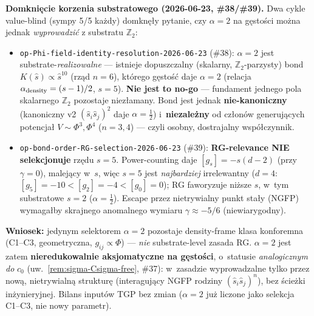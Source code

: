 \begin{remark}[Status $\alpha=2$ po~v2-pivocie --- 2026-04-25]
\medskip\noindent\textbf{Domkni\k{e}cie korzenia substratowego (2026-06-23, \#38/\#39).}
Dwa cykle value-blind (sympy 5/5 ka\.zdy) domkn\k{e}\l{}y pytanie, czy $\alpha=2$ na
g\k{e}sto\'sci mo\.zna jednak \emph{wyprowadzi\'c} z substratu $\mathbb{Z}_2$:
\begin{itemize}
  \item \texttt{op-Phi-field-identity-resolution-2026-06-23} (\#38): $\alpha=2$ jest
  substrate-\emph{realizowalne} --- istnieje dopuszczalny (skalarny, $\mathbb{Z}_2$-parzysty)
  bond $K(\hat s)\propto\hat s^{10}$ (rz\k{a}d $n=6$), kt\'orego g\k{e}sto\'s\'c daje $\alpha=2$
  (relacja $\alpha_{\rm density}=(s-1)/2$, $s=5$). \textbf{Nie jest to no-go} --- fundament
  jednego pola skalarnego $\mathbb{Z}_2$ pozostaje niez\l{}amany. Bond jest jednak
  \textbf{nie-kanoniczny} (kanoniczny v2 $(\hat s_i\hat s_j)^2$ daje $\alpha=\tfrac12$)
  i~\textbf{niezale\.zny} od cz\l{}on\'ow generuj\k{a}cych potencja\l{} $V\sim\Phi^3,\Phi^4$
  ($n=3,4$) --- czyli osobny, dostrajalny wsp\'o\l{}czynnik.
  \item \texttt{op-bond-order-RG-selection-2026-06-23} (\#39): \textbf{RG-relevance NIE
  selekcjonuje} rz\k{e}du $s=5$. Power-counting daje $[g_s]=-s(d-2)$ (przy $\gamma=0$),
  malej\k{a}cy w~$s$, wi\k{e}c $s=5$ jest \emph{najbardziej} irrelewantny ($d=4$:
  $[g_5]=-10<[g_2]=-4<[g_0]=0$); RG faworyzuje ni\.zsze $s$, w~tym substratowe $s=2$
  ($\alpha=\tfrac12$). Escape przez nietrywialny punkt sta\l{}y (NGFP) wymaga\l{}by skrajnego
  anomalnego wymiaru $\gamma\approx-5/6$ (niewiarygodny).
\end{itemize}
\textbf{Wniosek:} jedynym selektorem $\alpha=2$ pozostaje density-frame klasa konforemna
(C1--C3, geometryczna, $g_{ij}\propto\Phi$) --- \emph{nie} substrate-level zasada RG.
$\alpha=2$ jest zatem \textbf{nieredukowalnie aksjomatyczne na g\k{e}sto\'sci}, o~statusie
\emph{analogicznym do} $c_0$ (uw.~\ref{rem:sigma-Csigma-free}, \#37): w~zasadzie wyprowadzalne
tylko przez now\k{a}, nietrywialn\k{a} struktur\k{e} (interaguj\k{a}cy NGFP rodziny
$(\hat s_i\hat s_j)^n$), bez \'scie\.zki in\.zynieryjnej. Bilans input\'ow TGP bez zmian
($\alpha=2$ ju\.z liczone jako selekcja C1--C3, nie nowy parametr).


\end{remark}
